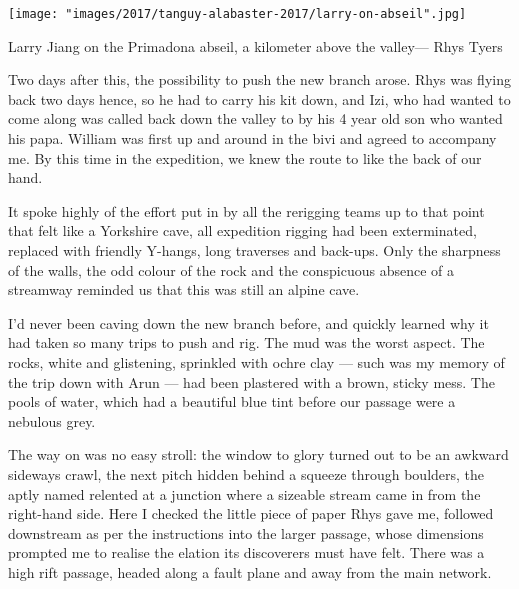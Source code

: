 \begin{marginfigure} \centering
\texttt{[image: "images/2017/tanguy-alabaster-2017/larry-on-abseil".jpg]}
\caption{Larry Jiang on the Primadona abseil, a kilometer above the \protect{} valley--- Rhys Tyers}
\end{marginfigure}

Two days after this, the possibility to push the new branch arose.  Rhys was flying back two days hence, so he had to carry his kit down, and Izi, who had wanted to come along was called back down the valley to  by his 4 year old son who wanted his papa. William was first up and around in the bivi and agreed to accompany me. By this time in the expedition, we knew the route to  like the back of our hand. 

It spoke highly of the effort put in by all the rerigging teams up to that point that  felt like a Yorkshire cave, all expedition rigging had been exterminated, replaced with friendly Y-hangs, long traverses and back-ups.  Only the sharpness of the walls, the odd colour of the rock and the conspicuous absence of a streamway reminded us that this was still an alpine cave.

I’d never been caving  down the new branch before, and quickly learned why it had taken so many trips to push and rig. The mud was the worst aspect. The rocks, white and glistening, sprinkled with ochre clay --- such was my memory of the trip down  with Arun --- had been plastered with a brown, sticky mess. The pools of water, which had a beautiful blue tint before our passage were a nebulous grey.  

The way on was no easy stroll: the window to glory turned out to be an awkward sideways crawl,  the next pitch hidden behind a squeeze through boulders, the aptly named  relented at a junction where a sizeable stream came in from the right-hand side. Here I checked the little piece of paper Rhys gave me, followed downstream as per the instructions into the larger  passage, whose dimensions prompted me to realise the elation its discoverers must have felt. There was a high rift passage, headed along a fault plane and away from the main  network.

